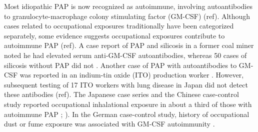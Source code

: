 \documentclass[a4
er,12pt]{article}
\begin{document}
Most idiopathic PAP is now recognized as autoimmune, involving autoantibodies to granulocyte-macrophage colony stimulating factor (GM-CSF) (ref).  Although cases related to occupational exposures traditionally have been categorized separately, some evidence suggests occupational exposures contribute to autoimmune PAP (ref).  A case report of PAP and silicosis in a former coal miner noted he had elevated serum anti-GM-CSF autoantibodies, whereas 50 cases of silicosis without PAP did
not \cite{Hosokawa2004}.  Another case of PAP with autoantibodies to GM-CSF was reported in an indium-tin oxide (ITO) production worker \cite{Cummings2010}.  However, subsequent testing of 17 ITO workers with lung disease in Japan did not detect these antibodies (ref).  The Japanese case series and the Chinese case-control study reported occupational inhalational exposure in about a third of those with autoimmune PAP \cite{Inoue2008}; \cite{Xiao2015}).  In the German case-control study, history of
occupational dust or fume exposure was associated with GM-CSF autoimmunity \cite{Bonella2011}.  
\end{document}
